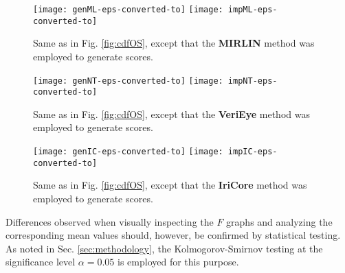 \documentclass[article,12pt]{elsarticle}
\begin{document}
\begin{figure}[!htb]
\centering
\texttt{[image: genML-eps-converted-to]}\hfill
\texttt{[image: impML-eps-converted-to]}
\caption{Same as in Fig. \ref{fig:cdfOS}, except that the {\bf MIRLIN} method was employed to generate scores.}
\label{fig:cdfML}
\end{figure}


\begin{figure}[!htb]
\centering
\texttt{[image: genNT-eps-converted-to]}\hfill
\texttt{[image: impNT-eps-converted-to]}
\caption{Same as in Fig. \ref{fig:cdfOS}, except that the {\bf VeriEye} method was employed to generate scores.}
\label{fig:cdfNT}
\end{figure}

\begin{figure}[!htb]
\centering
\texttt{[image: genIC-eps-converted-to]}\hfill
\texttt{[image: impIC-eps-converted-to]}
\caption{Same as in Fig. \ref{fig:cdfOS}, except that the {\bf IriCore} method was employed to generate scores.}
\label{fig:cdfIC}
\end{figure}


Differences observed when visually inspecting the $F$ graphs and analyzing the corresponding mean values should, however, be confirmed by statistical testing. As noted in Sec. \ref{sec:methodology}, the Kolmogorov-Smirnov testing at the significance level $\alpha=0.05$ is employed for this purpose.
\end{document}
